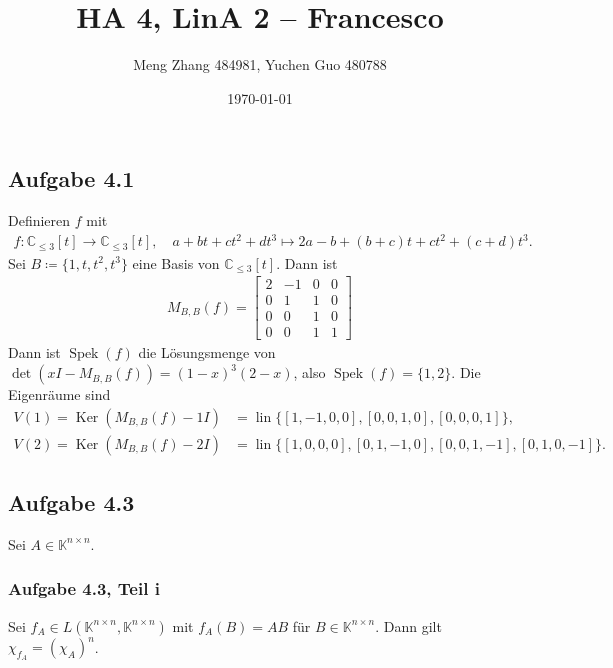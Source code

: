 \documentclass[draft,a5paper]{article}
\author{Meng Zhang 484981, Yuchen Guo 480788}
\date{\today}
\title{HA 4, LinA 2 -- Francesco}
\theoremstyle{remark}
\DeclareMathOperator{\Spek}{Spek}
\DeclareMathOperator{\lin}{lin}
\DeclareMathOperator{\Ker}{Ker}
\begin{document}
\maketitle

\subsection*{Aufgabe 4.1}

Definieren \(f\) mit
\begin{align*}
  f\colon \mathbb{C}_{\le 3}[t] \to \mathbb{C}_{\le 3}[t], \quad a + bt + ct^{2} + dt^{3} \mapsto 2a - b +
  (b+c)t + ct^{2} + (c+d)t^{3}.
\end{align*}
Sei \(B \coloneq \{1, t, t^{2}, t^{3}\}\) eine Basis von \(\mathbb{C}_{\le 3}[t]\).  Dann
ist
\begin{align*}
  M_{B,B}(f) =
  \begin{bmatrix}
    2 & -1 & 0 & 0\\
    0 & 1 & 1 & 0 \\
    0 & 0 & 1 & 0 \\
    0 & 0 & 1 & 1
  \end{bmatrix}
\end{align*}
Dann ist \(\Spek(f)\) die Lösungsmenge von \(\det(xI - M_{B,B}(f)) =
(1-x)^{3}(2-x) \), also \(\Spek(f) = \{1, 2\}\). Die Eigenräume sind
\begin{align*}
  V(1) = \Ker(M_{B,B}(f) - 1I) &= \lin\{[1, -1, 0, 0], [0, 0, 1, 0],
  [0, 0, 0, 1]\}, \\
  V(2) = \Ker(M_{B,B}(f) - 2I) &= \lin\{[1, 0, 0, 0], [0, 1, -1, 0],
  [0, 0, 1, -1], [0, 1, 0, -1]\}.
\end{align*}

\subsection*{Aufgabe 4.3}

Sei \(A \in \mathbb{K}^{n \times n}\).

\subsubsection*{Aufgabe 4.3, Teil i}

Sei \(f_{A} \in L(\mathbb{K}^{n \times n}, \mathbb{K}^{n \times n})\) mit \(f_{A}(B) = AB\) für \(B
\in \mathbb{K}^{n \times n}\).  Dann gilt \(\chi_{f_{A}} = (\chi_{A})^{n}\).
\end{document}
